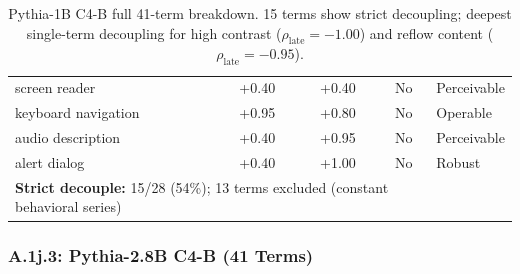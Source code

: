 \documentclass[10pt]{article} %
\begin{document}
\begin{table}[H]
\begin{tabular}{|l|c|c|c|l|}
screen reader & +0.40 & +0.40 & No & Perceivable \\
keyboard navigation & +0.95 & +0.80 & No & Operable \\
audio description & +0.40 & +0.95 & No & Perceivable \\
alert dialog & +0.40 & +1.00 & No & Robust \\
\hline
\multicolumn{4}{|l|}{\textbf{Strict decouple:} 15/28 (54\%); 13 terms excluded (constant behavioral series)} \\
\hline
\end{tabular}
\caption{Pythia-1B C4-B full 41-term breakdown. 15 terms show strict decoupling; deepest single-term decoupling for high contrast ($\rho_\text{late}=-1.00$) and reflow content ($\rho_\text{late}=-0.95$).}
\end{table}

\subsubsection*{A.1j.3: Pythia-2.8B C4-B (41 Terms)}
\end{document}
